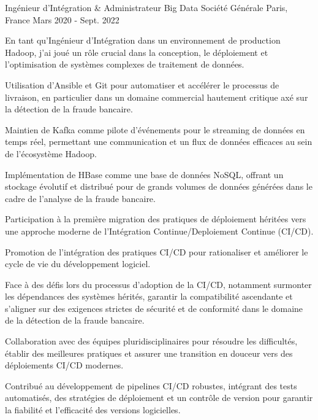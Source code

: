 \begin{cventries}
  \cventry
    {Ingénieur d'Intégration \& Administrateur Big Data} %
    {Société Générale} %
    {Paris, France} %
    {Mars 2020 - Sept. 2022} %
    {
      \begin{cvitems} %
        \item {En tant qu'Ingénieur d'Intégration dans un environnement de production Hadoop, j'ai joué un rôle crucial dans la conception, le déploiement et l'optimisation de systèmes complexes de traitement de données.}
        \item {Utilisation d'Ansible et Git pour automatiser et accélérer le processus de livraison, en particulier dans un domaine commercial hautement critique axé sur la détection de la fraude bancaire.}
        \item {Maintien de Kafka comme pilote d'événements pour le streaming de données en temps réel, permettant une communication et un flux de données efficaces au sein de l'écosystème Hadoop.}
        \item {Implémentation de HBase comme une base de données NoSQL, offrant un stockage évolutif et distribué pour de grands volumes de données générées dans le cadre de l'analyse de la fraude bancaire.}
        \item {Participation à la première migration des pratiques de déploiement héritées vers une approche moderne de l'Intégration Continue/Deploiement Continue (CI/CD).}
        \item {Promotion de l'intégration des pratiques CI/CD pour rationaliser et améliorer le cycle de vie du développement logiciel.}
        \item {Face à des défis lors du processus d'adoption de la CI/CD, notamment surmonter les dépendances des systèmes hérités, garantir la compatibilité ascendante et s'aligner sur des exigences strictes de sécurité et de conformité dans le domaine de la détection de la fraude bancaire.}
        \item {Collaboration avec des équipes pluridisciplinaires pour résoudre les difficultés, établir des meilleures pratiques et assurer une transition en douceur vers des déploiements CI/CD modernes.}
        \item {Contribué au développement de pipelines CI/CD robustes, intégrant des tests automatisés, des stratégies de déploiement et un contrôle de version pour garantir la fiabilité et l'efficacité des versions logicielles.}
      \end{cvitems}
    }


\end{cventries}
